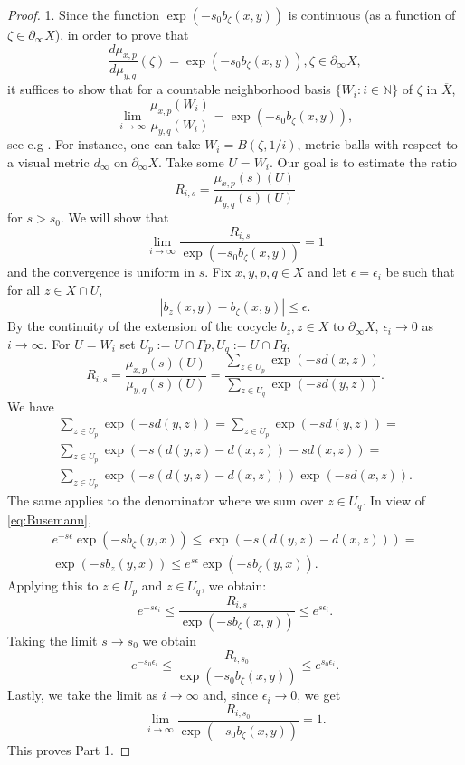 \documentclass[12pt]{amsbook}%
\theoremstyle{definition}
\theoremstyle{remark}
\numberwithin{section}{chapter}
\numberwithin{subsection}{section}
\numberwithin{figure}{chapter}
\def\eps{\epsilon}
\def\bN{{\mathbb{N}}}
\def\Ga{\Gamma}
\def\geo{\partial_\infty}
\def\ol{\overline}
\begin{document}
{{\begin{proof}
1. Since the function $\exp(-s_0 b_\zeta(x,y))$ is continuous (as a function 
of $\zeta\in \geo X$), in order to prove that 
$$
\frac{d\mu_{x,p}}{d\mu_{y,q}} (\zeta) = \exp(-s_0 b_\zeta(x,y)), \zeta\in \geo X,
$$
it suffices to show that for a countable neighborhood basis $\{W_i: i\in \bN\}$ of $\zeta$ in $\ol{X}$,
$$
\lim_{i\to\infty} \frac{\mu_{x,p}(W_i)}{\mu_{y,q}(W_i)}=\exp(-s_0 b_\zeta(x,y)), 
$$ 
see e.g \cite[\S 14.13]{Williams}. For instance, one can take $W_i=B(\zeta, 1/i)$, 
metric balls with respect to a visual metric $d_\infty$ on $\geo X$.  
Take some $U=W_i$. Our goal is to estimate the ratio
$$
 R_{i,s}=\frac{\mu_{x,p}(s)(U)}{\mu_{y,q}(s)(U)}
$$ 
for $s>s_0$. We will show that
$$
\lim_{i\to\infty} \frac{R_{i,s}}{\exp(-s_0 b_\zeta(x,y))}= 1
$$
and the convergence is uniform in $s$. Fix $x, y, p, q\in X$ and let $\eps=\eps_i$ be such that for all $z\in X\cap U$,
\begin{equation}\label{eq:Busemann}
|b_z(x,y)- b_\zeta(x,y)|\leqslant \eps. 
\end{equation}
By the continuity of the extension of the cocycle $b_z, z\in X$ to $\geo X$, $\eps_i\to 0$ as $i\to\infty$.  
For $U=W_i$ set $U_p:= U\cap \Ga p, U_q:= U\cap \Ga q$, 
$$
 R_{i,s}=\frac{\mu_{x,p}(s)(U)}{\mu_{y,q}(s)(U)}= \frac{\sum_{z\in U_p} \exp(-s d(x, z)) }{\sum_{z\in U_q} \exp(-s d(y, z))}. 
$$ 
We have
\begin{align*}
\sum_{z\in U_p} \exp(-s d(y, z))= \sum_{z\in U_p} \exp(-s d(y, z))=\\
 \sum_{z\in U_p} \exp(-s (d(y, z)- d(x,z)) -sd(x,z) )= \\
   \sum_{z\in U_p} \exp(-s (d(y, z)- d(x,z)) ) \exp(-sd(x,z) ).
\end{align*}
The same applies to the denominator where we sum over $z\in U_q$. 
In view of \eqref{eq:Busemann},
\begin{align*}
e^{-s\eps} \exp(-sb_\zeta(y, x)) \leqslant \exp(-s (d(y, z)- d(x,z)) ) = \\
\exp(-s b_z(y,x))\leqslant e^{s\eps} \exp(-sb_\zeta(y, x) ).
\end{align*}
Applying this to $z\in U_p$ and $z\in U_q$, we obtain: 
$$
e^{-s\eps_i} \leqslant \frac{R_{i,s}}{\exp(-sb_\zeta(x, y)) }\leqslant e^{s\eps_i}. 
$$
Taking the limit $s\to s_0$ we obtain
$$
e^{-s_0\eps_i} \leqslant \frac{R_{i,s_0}}{\exp(-s_0b_\zeta(x, y)) }\leqslant e^{s_0\eps_i}. 
$$
Lastly, we take the limit as $i\to\infty$ and, since $\eps_i\to 0$, we get
$$
\lim_{i\to\infty}  \frac{R_{i,s_0}}{\exp(-s_0b_\zeta(x, y)) }=1. 
$$
This proves Part 1. 


\end{proof}}}
\end{document}

